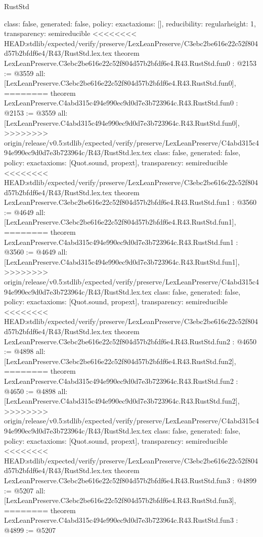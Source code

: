 \begin{lexlean}{RustStd}
\begin{coremodule}
{\begin{coremodule}
{{{  class: false,
  generated: false,
  policy: exact{axioms: []},
  reducibility: regular{height: 1},
  transparency: semireducible
}
<<<<<<<< HEAD:stdlib/expected/verify/preserve/LexLeanPreserve/C3ebc2be616e22c52f804d57b2bfdf6e4/R43/RustStd.lex.tex
theorem LexLeanPreserve.C3ebc2be616e22c52f804d57b2bfdf6e4.R43.RustStd.fun0 : @2153 := @3559 {
  all: [LexLeanPreserve.C3ebc2be616e22c52f804d57b2bfdf6e4.R43.RustStd.fun0],
========
theorem LexLeanPreserve.C4abd315c494e990ec9d0d7e3b723964c.R43.RustStd.fun0 : @2153 := @3559 {
  all: [LexLeanPreserve.C4abd315c494e990ec9d0d7e3b723964c.R43.RustStd.fun0],
>>>>>>>> origin/release/v0.5:stdlib/expected/verify/preserve/LexLeanPreserve/C4abd315c494e990ec9d0d7e3b723964c/R43/RustStd.lex.tex
  class: false,
  generated: false,
  policy: exact{axioms: [Quot.sound, propext]},
  transparency: semireducible
}
<<<<<<<< HEAD:stdlib/expected/verify/preserve/LexLeanPreserve/C3ebc2be616e22c52f804d57b2bfdf6e4/R43/RustStd.lex.tex
theorem LexLeanPreserve.C3ebc2be616e22c52f804d57b2bfdf6e4.R43.RustStd.fun1 : @3560 := @4649 {
  all: [LexLeanPreserve.C3ebc2be616e22c52f804d57b2bfdf6e4.R43.RustStd.fun1],
========
theorem LexLeanPreserve.C4abd315c494e990ec9d0d7e3b723964c.R43.RustStd.fun1 : @3560 := @4649 {
  all: [LexLeanPreserve.C4abd315c494e990ec9d0d7e3b723964c.R43.RustStd.fun1],
>>>>>>>> origin/release/v0.5:stdlib/expected/verify/preserve/LexLeanPreserve/C4abd315c494e990ec9d0d7e3b723964c/R43/RustStd.lex.tex
  class: false,
  generated: false,
  policy: exact{axioms: [Quot.sound, propext]},
  transparency: semireducible
}
<<<<<<<< HEAD:stdlib/expected/verify/preserve/LexLeanPreserve/C3ebc2be616e22c52f804d57b2bfdf6e4/R43/RustStd.lex.tex
theorem LexLeanPreserve.C3ebc2be616e22c52f804d57b2bfdf6e4.R43.RustStd.fun2 : @4650 := @4898 {
  all: [LexLeanPreserve.C3ebc2be616e22c52f804d57b2bfdf6e4.R43.RustStd.fun2],
========
theorem LexLeanPreserve.C4abd315c494e990ec9d0d7e3b723964c.R43.RustStd.fun2 : @4650 := @4898 {
  all: [LexLeanPreserve.C4abd315c494e990ec9d0d7e3b723964c.R43.RustStd.fun2],
>>>>>>>> origin/release/v0.5:stdlib/expected/verify/preserve/LexLeanPreserve/C4abd315c494e990ec9d0d7e3b723964c/R43/RustStd.lex.tex
  class: false,
  generated: false,
  policy: exact{axioms: [Quot.sound, propext]},
  transparency: semireducible
}
<<<<<<<< HEAD:stdlib/expected/verify/preserve/LexLeanPreserve/C3ebc2be616e22c52f804d57b2bfdf6e4/R43/RustStd.lex.tex
theorem LexLeanPreserve.C3ebc2be616e22c52f804d57b2bfdf6e4.R43.RustStd.fun3 : @4899 := @5207 {
  all: [LexLeanPreserve.C3ebc2be616e22c52f804d57b2bfdf6e4.R43.RustStd.fun3],
========
theorem LexLeanPreserve.C4abd315c494e990ec9d0d7e3b723964c.R43.RustStd.fun3 : @4899 := @5207 {
}}}}}}}
\end{coremodule}}
\end{coremodule}
\end{lexlean}
